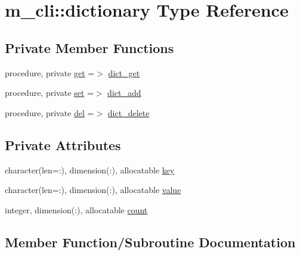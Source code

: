 \hypertarget{structm__cli_1_1dictionary}{}\section{m\+\_\+cli\+:\+:dictionary Type Reference}
\label{structm__cli_1_1dictionary}
\subsection*{Private Member Functions}
\begin{DoxyCompactItemize}
\item 
procedure, private \mbox{\hyperlink{structm__cli_1_1dictionary_a00a446dbb6b83b8656f681c5d8ee6c3b}{get}} =$>$ \mbox{\hyperlink{namespacem__cli_ac4a889309ffc333af6bf8e11f1fc4869}{dict\+\_\+get}}
\item 
procedure, private \mbox{\hyperlink{structm__cli_1_1dictionary_adb28601e3f877106d0dfd143b72cd8a4}{set}} =$>$ \mbox{\hyperlink{namespacem__cli_a1be098e2b920e8d50ed14be03a3133db}{dict\+\_\+add}}
\item 
procedure, private \mbox{\hyperlink{structm__cli_1_1dictionary_aea651d5f1d801e67a9af3ebb863c537c}{del}} =$>$ \mbox{\hyperlink{namespacem__cli_aff32e44070983c7fb4eb0a3b1dea7a6d}{dict\+\_\+delete}}
\end{DoxyCompactItemize}
\subsection*{Private Attributes}
\begin{DoxyCompactItemize}
\item 
character(len=\+:), dimension(\+:), allocatable \mbox{\hyperlink{structm__cli_1_1dictionary_a78ba0e921972470e53589478dd87111f}{key}}
\item 
character(len=\+:), dimension(\+:), allocatable \mbox{\hyperlink{structm__cli_1_1dictionary_ae0e73cb96f08397f3dcbba02d2549430}{value}}
\item 
integer, dimension(\+:), allocatable \mbox{\hyperlink{structm__cli_1_1dictionary_aa83a3a6f250e1ff009492ff5c7926877}{count}}
\end{DoxyCompactItemize}


\subsection{Member Function/\+Subroutine Documentation}
\mbox{\label{structm__cli_1_1dictionary_aea651d5f1d801e67a9af3ebb863c537c}} 
